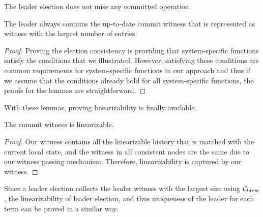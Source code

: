 \begin{lemma}\label{lemma:chapter:witnesspassing:election-consistency}
The leader election does not miss any committed operation.
\end{lemma}

\begin{lemma} 
The leader always contains the up-to-date commit witness that is represented as
witness with the largest number of entries.
\end{lemma}

\begin{proof}
Proving the election consistency is providing that system-specific functions satisfy the conditions that we illustrated. However, satisfying these
conditions are common requirements for system-specific functions in
our approach and thus if we assume that the conditions already hold for all
system-specific functions, the proofs for the lemmas are straightforward.
\end{proof}

With these lemmas, proving  linearizability is finally available.

\begin{theorem}[linearizability]\label{theorem:chapter:witnesspassing:linear-spec}
The commit witness is linearizable.
\end{theorem}

\begin{proof}
Our witness contains all the linearizable history that is matched with the current local state, 
and the witness in all consistent nodes are the same due to our witness passing mechanism. 
Therefore, linearizability is captured by our witness.
\end{proof}

Since a leader election collects the leader witness with the largest
size using $\mathcal{C}_{ldr\varpi}$, the linearizability of leader election, and thus uniqueness of the leader
for each term can be proved in a similar way. 
